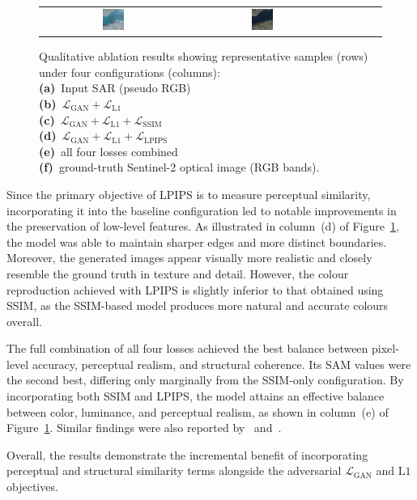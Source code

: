 \begin{figure}[h!]
\begin{tabular}{*{6}{c}}
        \includegraphics[width=0.155\textwidth]{img/ablation/sample_4/all.png}   &
        \includegraphics[width=0.155\textwidth]{img/ablation/sample_4/gt.png}                                  \\
    \end{tabular}

    \caption{%
    Qualitative ablation results showing representative samples (rows) under four configurations (columns):\\
    \textbf{(a)}~Input SAR (pseudo RGB)\\
    \textbf{(b)}~$\mathcal{L}_{\text{GAN}}{+}\mathcal{L}_{\text{L1}}$\\
    \textbf{(c)}~$\mathcal{L}_{\text{GAN}}{+}\mathcal{L}_{\text{L1}}{+}\mathcal{L}_{\text{SSIM}}$\\
    \textbf{(d)}~$\mathcal{L}_{\text{GAN}}{+}\mathcal{L}_{\text{L1}}{+}\mathcal{L}_{\text{LPIPS}}$\\
    \textbf{(e)}~all four losses combined\\
    \textbf{(f)}~ground-truth Sentinel-2 optical image (RGB bands).
    }
    \label{fig:ablation_samples}
\end{figure}

Since the primary objective of LPIPS is to measure perceptual similarity, incorporating it into the baseline configuration led to notable improvements in the preservation of low-level features. As illustrated in column~(d) of Figure~\ref{fig:ablation_samples}, the model was able to maintain sharper edges and more distinct boundaries. Moreover, the generated images appear visually more realistic and closely resemble the ground truth in texture and detail. However, the colour reproduction achieved with LPIPS is slightly inferior to that obtained using SSIM, as the SSIM-based model produces more natural and accurate colours overall.

The full combination of all four losses achieved the best balance between pixel-level accuracy, perceptual realism, and structural coherence. 
Its SAM values were the second best, differing only marginally from the SSIM-only configuration. 
By incorporating both SSIM and LPIPS, the model attains an effective balance between color, luminance, and perceptual realism, as shown in column~(e) of Figure~\ref{fig:ablation_samples}. 
Similar findings were also reported by~\cite{s2o_ViT_cGAN} and~\cite{CR_RS_GAN_s2o}. 
 
Overall, the results demonstrate the incremental benefit of incorporating perceptual and structural similarity terms alongside the adversarial $\mathcal{L}_{\text{GAN}}$ and $\mathrm{L1}$ objectives. 
